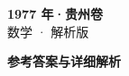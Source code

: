 \documentclass[zihao=-4, a4paper]{ctexart}
\begin{document}
\begin{center}
  {\Large\bfseries 1977 年·贵州卷}\\[4pt]
  {\large 数学 · 解析版}
\end{center}
\medskip
{}

\clearpage
{}
\begin{center}{\Large\bfseries 参考答案与详细解析}\end{center}
\medskip

\end{document}
